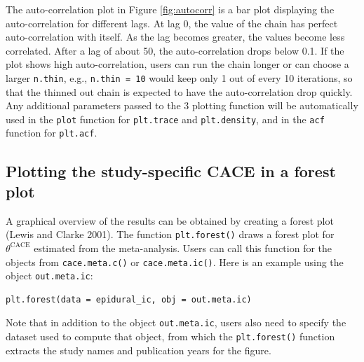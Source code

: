 The auto-correlation plot in Figure \ref{fig:autocorr} is a bar plot displaying the auto-correlation for different lags.
At lag 0, the value of the chain has perfect auto-correlation with itself. As the lag becomes greater, the values become less correlated. After a lag of about 50, the auto-correlation drops below 0.1. If the plot shows high auto-correlation, users can run the chain longer or can choose a larger \texttt{n.thin}, e.g., \texttt{n.thin\ =\ 10} would keep only 1 out of every 10 iterations, so that the thinned out chain is expected to have the auto-correlation drop quickly. Any additional parameters passed to the 3 plotting function will be automatically used in the \texttt{plot} function for \texttt{plt.trace} and \texttt{plt.density}, and in the \texttt{acf} function for \texttt{plt.acf}.

\hypertarget{plotting-the-study-specific-cace-in-a-forest-plot}{%
\subsection{Plotting the study-specific CACE in a forest plot}\label{plotting-the-study-specific-cace-in-a-forest-plot}}

A graphical overview of the results can be obtained by creating a forest plot (Lewis and Clarke 2001). The function \texttt{plt.forest()} draws a forest plot for \(\theta^{\text{CACE}}\) estimated from the meta-analysis.
Users can call this function for the objects from \texttt{cace.meta.c()} or \texttt{cace.meta.ic()}.
Here is an example using the object \texttt{out.meta.ic}:

\begin{verbatim}
plt.forest(data = epidural_ic, obj = out.meta.ic)
\end{verbatim}

\noindent Note that in addition to the object \texttt{out.meta.ic}, users also need to specify the dataset used to compute that object, from which the \texttt{plt.forest()} function extracts the study names and publication years for the figure.

